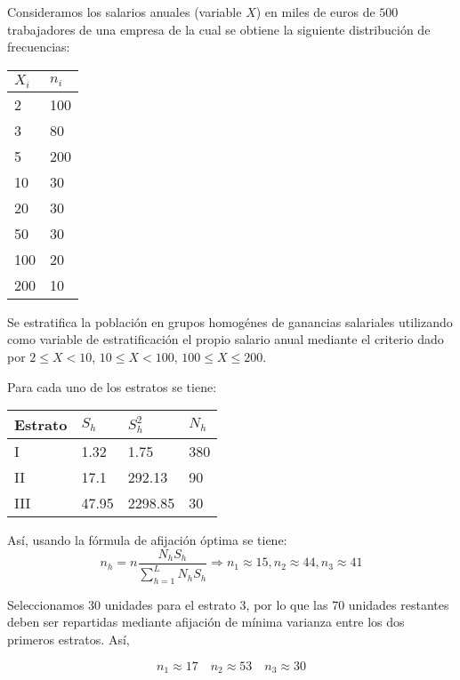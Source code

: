 \addpoints
\question[20] Consideramos los salarios anuales (variable $X$) en miles de euros de $500$ trabajadores de una empresa de la cual se obtiene la siguiente distribución de frecuencias:
\begin{table}[h]
\centering
\begin{tabular}{l|l}
$X_i$ & $n_i$ \\ \hline
2     & 100   \\
3     & 80    \\
5     & 200   \\
10    & 30    \\
20    & 30    \\
50    & 30    \\
100   & 20    \\
200   & 10   
\end{tabular}
\end{table}

Se estratifica la población en grupos homogénes de ganancias salariales utilizando como variable de estratificación el propio salario anual mediante el criterio dado por $2\leq X <10$, $10\leq X <100$, $100\leq X \leq 200$.
\noaddpoints
{}
\begin{solution}
Para cada uno de los estratos se tiene: 
\begin{table}[h]
\centering
\begin{tabular}{|l|l|l|l|}
\hline
Estrato & $S_h$ & $S_{h}^{2}$ & $N_h$ \\ \hline
I       & 1.32  & 1.75        & 380   \\ \hline
II      & 17.1  & 292.13      & 90    \\ \hline
III     & 47.95 & 2298.85     & 30    \\ \hline
\end{tabular}
\end{table}
Así, usando la fórmula de afijación óptima se tiene: 
$$n_{h}=n\dfrac{N_h S_h}{\sum_{h=1}^{L}N_h S_h} \Rightarrow n_1 \approx 15, n_2 \approx 44, n_3\approx 41$$

Seleccionamos 30 unidades para el estrato 3, por lo que las 70 unidades restantes deben ser repartidas mediante afijación de mínima varianza entre los dos primeros estratos. Así, 

$$n_1\approx17 \quad n_2 \approx 53 \quad n_3 \approx 30$$

\end{solution}